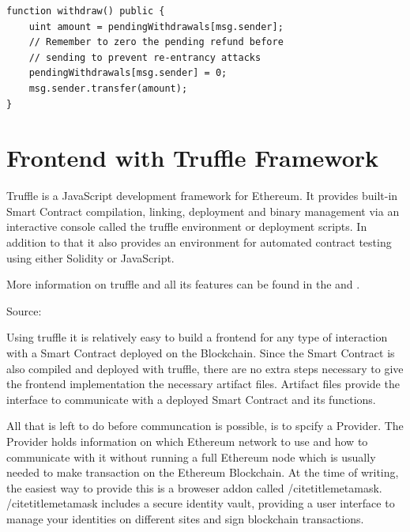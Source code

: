\begin{lstlisting}[language=Solidity]
function withdraw() public {
    uint amount = pendingWithdrawals[msg.sender];
    // Remember to zero the pending refund before
    // sending to prevent re-entrancy attacks
    pendingWithdrawals[msg.sender] = 0;
    msg.sender.transfer(amount);
}
\end{lstlisting}

\newpage

\section{Frontend with Truffle Framework}\label{sec:truffle}

Truffle is a JavaScript development framework for Ethereum. It provides built-in Smart Contract compilation, linking, deployment and binary management via an interactive console called the truffle environment or deployment scripts. In addition to that it also provides an environment for automated contract testing using either Solidity or JavaScript.

More information on truffle and all its features can be found in the  and .

\begin{flushright}
Source: 
\end{flushright}

Using truffle it is relatively easy to build a frontend for any type of interaction with a Smart Contract deployed on the Blockchain. Since the Smart Contract is also compiled and deployed with truffle, there are no extra steps necessary to give the frontend implementation the necessary artifact files. Artifact files provide the interface to communicate with a deployed Smart Contract and its functions.

All that is left to do before communcation is possible, is to spcify a Provider. The Provider holds information on which Ethereum network to use and how to communicate with it without running a full Ethereum node which is usually needed to make transaction on the Ethereum Blockchain. At the time of writing, the easiest way to provide this is a broweser addon called /citetitle{metamask}. /citetitle{metamask} includes a secure identity vault, providing a user interface to manage your identities on different sites and sign blockchain transactions.

